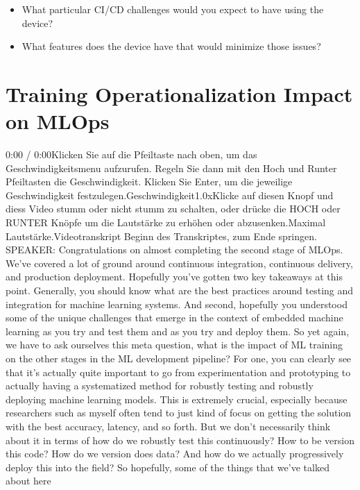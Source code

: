 {{{{\begin{itemize}
  \item What particular CI/CD challenges would you expect to have using the device? 
  \item What features does the device have that would minimize those issues? 
\end{itemize}

\section{Training Operationalization Impact on MLOps}

    0:00 / 0:00Klicken Sie auf die Pfeiltaste nach oben, um das Geschwindigkeitsmenu aufzurufen. Regeln Sie dann mit den Hoch und Runter Pfeiltasten die Geschwindigkeit. Klicken Sie Enter, um die jeweilige Geschwindigkeit festzulegen.Geschwindigkeit1.0xKlicke auf diesen Knopf und diess Video stumm oder nicht stumm zu schalten, oder drücke die HOCH oder RUNTER Knöpfe um die Lautstärke zu erhöhen oder abzusenken.Maximal Lautstärke.Videotranskript
    Beginn des Transkriptes, zum Ende springen.
    SPEAKER: Congratulations on almost completing the second stage of MLOps.
    We've covered a lot of ground around continuous integration,
    continuous delivery, and production deployment.
    Hopefully you've gotten two key takeaways at this point.
    Generally, you should know what are the best
    practices around testing and integration for machine learning systems.
    And second, hopefully you understood some
    of the unique challenges that emerge in the context of embedded machine
    learning as you try and test them and as you try and deploy them.
    So yet again, we have to ask ourselves this meta question, what
    is the impact of ML training on the other stages in the ML development
    pipeline?
    For one, you can clearly see that it's actually quite important
    to go from experimentation and prototyping
    to actually having a systematized method for robustly testing
    and robustly deploying machine learning models.
    This is extremely crucial, especially because researchers such as myself
    often tend to just kind of focus on getting the solution with the best
    accuracy, latency, and so forth.
    But we don't necessarily think about it in terms of how
    do we robustly test this continuously?
    How to be version this code?
    How do we version does data?
    And how do we actually progressively deploy this into the field?
    So hopefully, some of the things that we've talked about here
}}}}
